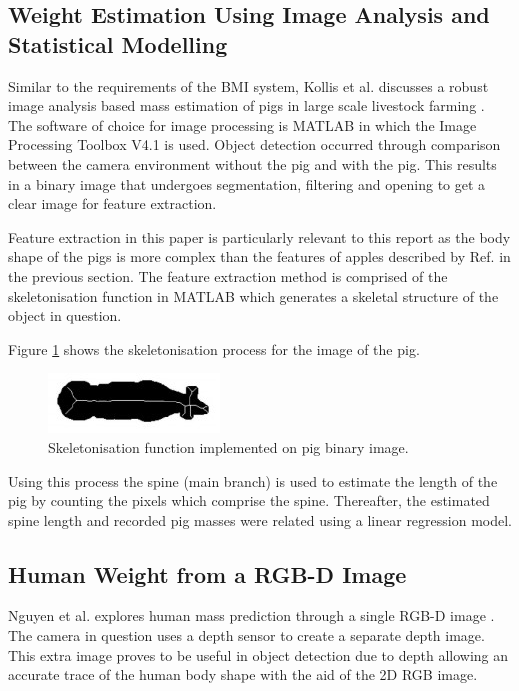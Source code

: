 \documentclass[conference]{IEEEtran}
\begin{document}
\subsection{Weight Estimation Using Image Analysis and Statistical Modelling}
Similar to the requirements of the BMI system, Kollis et al. discusses a robust image analysis based mass estimation of pigs in large scale livestock farming \cite{kollis2007weight}. 
The software of choice for image processing is MATLAB in which the Image Processing Toolbox V4.1 is used.
Object detection occurred through comparison between the camera environment without the pig and with the pig.
This results in a binary image that undergoes segmentation, filtering and opening to get a clear image for feature extraction.

Feature extraction in this paper is particularly relevant to this report as the body shape of the pigs is more complex than the features of apples described by Ref. \cite{comert} in the previous section. 
The feature extraction method is comprised of the skeletonisation function in MATLAB which generates a skeletal structure of the object in question.

Figure \ref{fig:pigskeleton} shows the skeletonisation process for the image of the pig.
\begin{figure}
    \centering
    \includegraphics[width=\linewidth]{pigskeleton.jpg}
    \caption{Skeletonisation function implemented on pig binary image\cite{kollis2007weight}.}
    \label{fig:pigskeleton}
\end{figure}

Using this process the spine (main branch) is used to estimate the length of the pig by counting the pixels which comprise the spine.
Thereafter, the estimated spine length and recorded pig masses were related using a linear regression model.

\subsection{Human Weight from a RGB-D Image}
Nguyen et al. explores human mass prediction through a single RGB-D image \cite{nguyen2014seeing}.
The camera in question uses a depth sensor to create a separate depth image. 
This extra image proves to be useful in object detection due to depth allowing an accurate trace of the human body shape with the aid of the 2D RGB image. 
\end{document}
